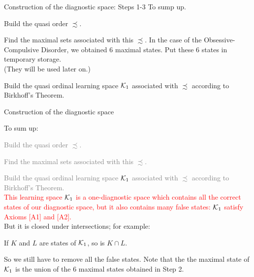 \documentclass{beamer}
\def\tl{\vskip 2mm}
\def\KKK{{\cal K}}
\def\pha{\phantom}
\def\rtxt#1{\textcolor{red}{#1}}
\def\gtxt#1{\textcolor{gray}{#1}}
\begin{document}

\begin{frame}{Construction of the diagnostic space: Steps 1-3}
\center
To sump up.
\tl

\begin{minipage}{11.5cm} 
\begin{roster}
\item[1.]   Build the quasi order $\precsim$. 
\item[2.]  Find the maximal sets associated with this $\precsim$.  In the case of  the Obsessive-Compulsive Disorder, we obtained 6 maximal states.
Put these $6$ states in temporary storage.\\
(They will be used later on.)
\item[3.]   Build the quasi ordinal learning space $\KKK_1$ associated with $\precsim$ according to  Birkhoff's Theorem.
\end{roster}
\end{minipage}
\pha{x}

\pha{x} 

\pha{x}

\pha{x}

\pha{x} 
 \vspace{.5cm}

\end{frame}
\begin{frame}{Construction of the diagnostic space}
\center

To sum up:
\tl
\begin{minipage}{11.5cm} 
\begin{roster}
\item[1.]   \gtxt{Build the quasi order $\precsim$.}
\item[2.]  \gtxt{Find the maximal sets associated with this $\precsim$. }
\item[3.]  \gtxt{Build the quasi ordinal learning space $\KKK_1$ associated with $\precsim$ according to  Birkhoff's Theorem.} \\ [2mm]
\rtxt{ This learning space $\KKK_1$ is a one-diagnostic space which  contains all the correct states of our diagnostic space, but it also contains many false states: $\KKK_1$ satisfy Axioms [A1] and [A2]. }\\[2mm]
 But it is closed under intersections; for example: 
 \tl
 \centerline{If $K$ and $L$ are states of $\KKK_1$, so is $K\cap L$.}
 \tl 
 So we still have to remove all the false states.
Note that the the maximal state of $\KKK_1$  is the union of the 6 maximal states obtained in Step 2.
\end{roster}
\end{minipage}
 \vspace{.5cm}

\end{frame}
\end{document}
